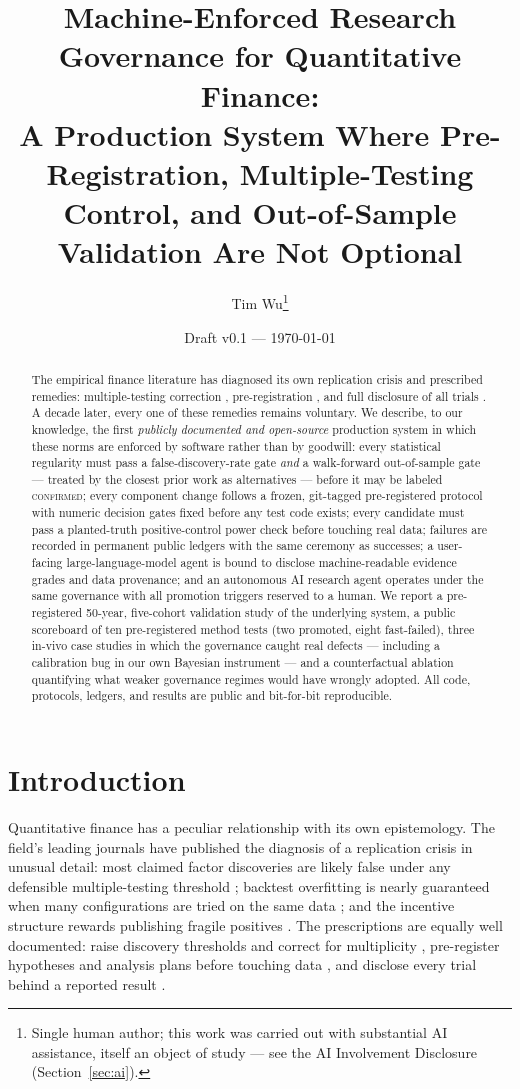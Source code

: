 \documentclass[11pt]{article}
\title{Machine-Enforced Research Governance for Quantitative Finance:\\
A Production System Where Pre-Registration, Multiple-Testing\\
Control, and Out-of-Sample Validation Are Not Optional}
\author{Tim Wu\thanks{Single human author; this work was carried out with
substantial AI assistance, itself an object of study --- see the AI
Involvement Disclosure (Section~\ref{sec:ai}).}}
\date{Draft v0.1 --- \today}
\newcommand{\CONFIRMED}{\textsc{confirmed}}
\begin{document}
\maketitle

\begin{abstract}
The empirical finance literature has diagnosed its own replication crisis
and prescribed remedies: multiple-testing correction
\citep{harvey2016and}, pre-registration \citep{harvey2017presidential},
and full disclosure of all trials \citep{bailey2017probability,
fabozzi2018being}. A decade later, every one of these remedies remains
voluntary. We describe, to our knowledge, the first \emph{publicly
documented and open-source} production system in which these norms are
enforced by software rather than by goodwill: every statistical
regularity must pass a false-discovery-rate gate \emph{and} a
walk-forward out-of-sample gate --- treated by the closest prior work as
alternatives \citep{harvey2016and} --- before it may be labeled
\CONFIRMED{}; every component change follows a frozen, git-tagged
pre-registered protocol with numeric decision gates fixed before any test
code exists; every candidate must pass a planted-truth positive-control
power check before touching real data; failures are recorded in permanent
public ledgers with the same ceremony as successes; a user-facing
large-language-model agent is bound to disclose machine-readable evidence
grades and data provenance; and an autonomous AI research agent operates
under the same governance with all promotion triggers reserved to a
human. We report a pre-registered 50-year, five-cohort validation study
of the underlying system, a public scoreboard of ten pre-registered
method tests (two promoted, eight fast-failed), three in-vivo case
studies in which the governance caught real defects --- including a
calibration bug in our own Bayesian instrument --- and a counterfactual
ablation quantifying what weaker governance regimes would have wrongly
adopted. All code, protocols, ledgers, and results are public and
bit-for-bit reproducible.
\end{abstract}

\section{Introduction}\label{sec:intro}

Quantitative finance has a peculiar relationship with its own
epistemology. The field's leading journals have published the diagnosis
of a replication crisis in unusual detail: most claimed factor
discoveries are likely false under any defensible multiple-testing
threshold \citep{harvey2016and}; backtest overfitting is nearly
guaranteed when many configurations are tried on the same data
\citep{bailey2017probability}; and the incentive structure rewards
publishing fragile positives \citep{harvey2017presidential}. The
prescriptions are equally well documented: raise discovery thresholds
and correct for multiplicity \citep{harvey2016and}, pre-register
hypotheses and analysis plans before touching data
\citep{harvey2017presidential, chambers2013registered,
bloomfield2018gathering}, and disclose every trial behind a reported
result \citep{fabozzi2018being}.
\end{document}
